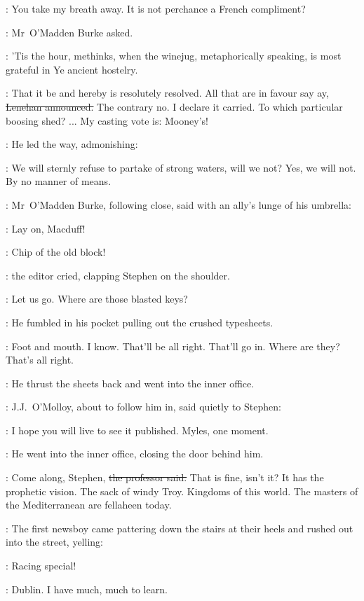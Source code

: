 \omaddenburke:
You take my breath away.
It is not perchance a French compliment?

:
Mr~O'Madden Burke asked.

\omaddenburke:
'Tis the hour,
methinks,
when the winejug,
metaphorically speaking,
is most grateful in Ye ancient hostelry.

\lenehan:
That it be and hereby is resolutely resolved.
All that are in favour
say ay,
\sout{Lenehan announced.}
The contrary no.
I declare it carried.
To which particular boosing shed? ...
My casting vote is:
Mooney's!

:
He led the way,
admonishing:

\lenehan:
We will sternly refuse to partake of strong waters,
will we not?
Yes, we will not.
By no manner of means.

:
Mr~O'Madden Burke,
following close,
said with an ally's lunge of his umbrella:

\omaddenburke:
Lay on, Macduff!

\crawford:
Chip of the old block!

:
the editor cried,
clapping Stephen on the shoulder.

\crawford:
Let us go.
Where are those blasted keys?

:
He fumbled in his pocket
pulling out the crushed typesheets.

\crawford:
Foot and mouth.
I know.
That'll be all right.
That'll go in.
Where are they?
That's all right.

:
He thrust the sheets back
and went into the inner office.



:
J.J.~O'Molloy,
about to follow him in,
said quietly to Stephen:

\jjom:
I hope you will live to see it published.
Myles, one moment.

:
He went into the inner office,
closing the door behind him.

\machugh:
Come along, Stephen,
\sout{the professor said.}
That is fine, isn't it?
It has the prophetic vision.
The sack of windy Troy.
Kingdoms of this world.
The masters of the Mediterranean are fellaheen today.

:
The first newsboy came pattering down the stairs at their heels
and rushed out into the street,
yelling:

\boy:
Racing special!

\StephenInt:
Dublin.
I have much, much to learn.

